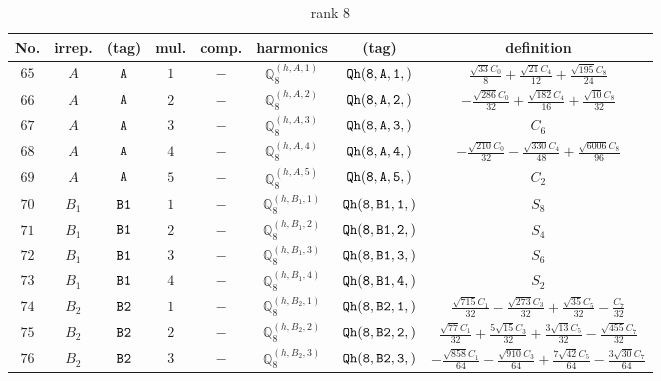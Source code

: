 \documentclass[fleqn,8pt]{jsarticle}
\begin{document}
\begin{table}[ht!]
\begin{center}
\caption{rank 8}
\renewcommand{\arraystretch}{1.3}
\begin{tabular}{cccccccc} \hline \hline
No. & irrep. & (tag) & mul. & comp. & harmonics & (tag) & definition \\ \hline
$ 65 $ & $ A $ & $ {\tt A} $ & $ 1 $ & $ - $ & $ \mathbb{Q}_{8}^{(h,A,1)} $ & $ {\tt Qh(8,A,1,)} $ & $ \frac{\sqrt{33} C_{0}}{8} + \frac{\sqrt{21} C_{4}}{12} + \frac{\sqrt{195} C_{8}}{24} $ \\
$ 66 $ & $ A $ & $ {\tt A} $ & $ 2 $ & $ - $ & $ \mathbb{Q}_{8}^{(h,A,2)} $ & $ {\tt Qh(8,A,2,)} $ & $ - \frac{\sqrt{286} C_{0}}{32} + \frac{\sqrt{182} C_{4}}{16} + \frac{\sqrt{10} C_{8}}{32} $ \\
$ 67 $ & $ A $ & $ {\tt A} $ & $ 3 $ & $ - $ & $ \mathbb{Q}_{8}^{(h,A,3)} $ & $ {\tt Qh(8,A,3,)} $ & $ C_{6} $ \\
$ 68 $ & $ A $ & $ {\tt A} $ & $ 4 $ & $ - $ & $ \mathbb{Q}_{8}^{(h,A,4)} $ & $ {\tt Qh(8,A,4,)} $ & $ - \frac{\sqrt{210} C_{0}}{32} - \frac{\sqrt{330} C_{4}}{48} + \frac{\sqrt{6006} C_{8}}{96} $ \\
$ 69 $ & $ A $ & $ {\tt A} $ & $ 5 $ & $ - $ & $ \mathbb{Q}_{8}^{(h,A,5)} $ & $ {\tt Qh(8,A,5,)} $ & $ C_{2} $ \\
$ 70 $ & $ B_{1} $ & $ {\tt B1} $ & $ 1 $ & $ - $ & $ \mathbb{Q}_{8}^{(h,B_{1},1)} $ & $ {\tt Qh(8,B1,1,)} $ & $ S_{8} $ \\
$ 71 $ & $ B_{1} $ & $ {\tt B1} $ & $ 2 $ & $ - $ & $ \mathbb{Q}_{8}^{(h,B_{1},2)} $ & $ {\tt Qh(8,B1,2,)} $ & $ S_{4} $ \\
$ 72 $ & $ B_{1} $ & $ {\tt B1} $ & $ 3 $ & $ - $ & $ \mathbb{Q}_{8}^{(h,B_{1},3)} $ & $ {\tt Qh(8,B1,3,)} $ & $ S_{6} $ \\
$ 73 $ & $ B_{1} $ & $ {\tt B1} $ & $ 4 $ & $ - $ & $ \mathbb{Q}_{8}^{(h,B_{1},4)} $ & $ {\tt Qh(8,B1,4,)} $ & $ S_{2} $ \\
$ 74 $ & $ B_{2} $ & $ {\tt B2} $ & $ 1 $ & $ - $ & $ \mathbb{Q}_{8}^{(h,B_{2},1)} $ & $ {\tt Qh(8,B2,1,)} $ & $ \frac{\sqrt{715} C_{1}}{32} - \frac{\sqrt{273} C_{3}}{32} + \frac{\sqrt{35} C_{5}}{32} - \frac{C_{7}}{32} $ \\
$ 75 $ & $ B_{2} $ & $ {\tt B2} $ & $ 2 $ & $ - $ & $ \mathbb{Q}_{8}^{(h,B_{2},2)} $ & $ {\tt Qh(8,B2,2,)} $ & $ \frac{\sqrt{77} C_{1}}{32} + \frac{5 \sqrt{15} C_{3}}{32} + \frac{3 \sqrt{13} C_{5}}{32} - \frac{\sqrt{455} C_{7}}{32} $ \\
$ 76 $ & $ B_{2} $ & $ {\tt B2} $ & $ 3 $ & $ - $ & $ \mathbb{Q}_{8}^{(h,B_{2},3)} $ & $ {\tt Qh(8,B2,3,)} $ & $ - \frac{\sqrt{858} C_{1}}{64} - \frac{\sqrt{910} C_{3}}{64} + \frac{7 \sqrt{42} C_{5}}{64} - \frac{3 \sqrt{30} C_{7}}{64} $ \\

\end{tabular}
\end{center}
\end{table}
\end{document}

